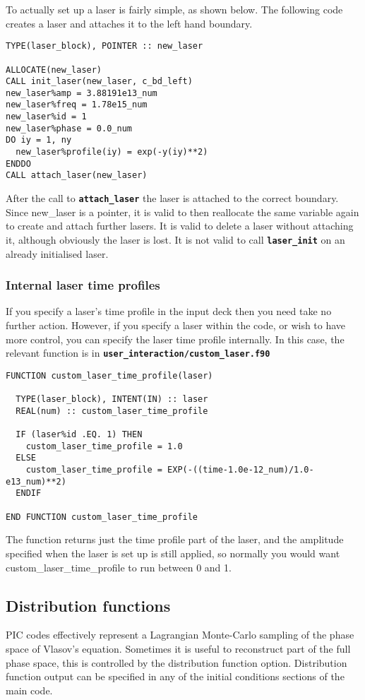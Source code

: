 \documentclass[12pt,a4paper]{article}
\newcommand{\simpleboxverbatim}{\begin{Verbatim}[obeytabs=true,frame=single,
  framerule=0.5mm,rulecolor=\color{warwickmid},formatcom=\color{black}]}
\newcommand{\inlinecode}[1]{{\color{warwickred} \bf\texttt{#1}}}
\begin{document}
To actually set up a laser is fairly simple, as shown below. The following
code creates a laser and attaches it to the left hand boundary.
\simpleboxverbatim
TYPE(laser_block), POINTER :: new_laser

ALLOCATE(new_laser)
CALL init_laser(new_laser, c_bd_left)
new_laser%amp = 3.88191e13_num
new_laser%freq = 1.78e15_num
new_laser%id = 1
new_laser%phase = 0.0_num
DO iy = 1, ny
  new_laser%profile(iy) = exp(-y(iy)**2)
ENDDO
CALL attach_laser(new_laser)
\end{Verbatim}
After the call to \inlinecode{attach\_laser} the laser is attached to the
correct boundary. Since new\_laser is a pointer, it is valid to then reallocate
the same variable again to create and attach further lasers. It is valid to
delete a laser without attaching it, although obviously the laser is lost. It
is not valid to call \inlinecode{laser\_init} on an already initialised laser.

\subsubsection{Internal laser time profiles}
If you specify a laser's time profile in the input deck then you need take no
further action. However, if you specify a laser within the code, or wish to
have more control, you can specify the laser time profile internally. In this
case, the relevant function is in
\inlinecode{user\_interaction/custom\_laser.f90}
\simpleboxverbatim
FUNCTION custom_laser_time_profile(laser)

  TYPE(laser_block), INTENT(IN) :: laser
  REAL(num) :: custom_laser_time_profile

  IF (laser%
    custom_laser_time_profile = 1.0
  ELSE
    custom_laser_time_profile = EXP(-((time-1.0e-12_num)/1.0-e13_num)**2)
  ENDIF

END FUNCTION custom_laser_time_profile
\end{Verbatim}
The function returns just the time profile part of the laser, and the
amplitude specified when the laser is set up is still applied, so normally you
would want custom\_laser\_time\_profile to run between 0 and 1.

\subsection{Distribution functions}
PIC codes effectively represent a Lagrangian Monte-Carlo sampling of the phase
space of Vlasov's equation. Sometimes it is useful to reconstruct part of the
full phase space, this is controlled by the distribution function
option.  Distribution function output can
be specified in any of the initial conditions sections of the main code.
\end{document}
